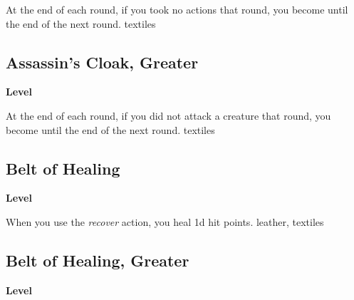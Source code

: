 \vspace{-1.5em}  %
At the end of each round, if you took no actions that round, you become  until the end of the next round.
 
 textiles
\begin{multicols}{2}
\lowercase{\hypertarget{item:Assassin's Cloak, Greater}{}}\label{item:Assassin's Cloak, Greater}
\hypertarget{item:Assassin's Cloak, Greater}{\subsection{Assassin's Cloak, Greater}}
\columnbreak%
\begin{flushright}
\large\textbf{ Level}
\end{flushright}
\end{multicols}
\vspace{-1.5em}  %
At the end of each round, if you did not attack a creature that round, you become  until the end of the next round.
 
 textiles
\begin{multicols}{2}
\lowercase{\hypertarget{item:Belt of Healing}{}}\label{item:Belt of Healing}
\hypertarget{item:Belt of Healing}{\subsection{Belt of Healing}}
\columnbreak%
\begin{flushright}
\large\textbf{ Level}
\end{flushright}
\end{multicols}
\vspace{-1.5em}  %
When you use the \textit{recover} action, you heal \plus1d hit points.
 
 leather, textiles
\begin{multicols}{2}
\lowercase{\hypertarget{item:Belt of Healing, Greater}{}}\label{item:Belt of Healing, Greater}
\hypertarget{item:Belt of Healing, Greater}{\subsection{Belt of Healing, Greater}}
\columnbreak%
\begin{flushright}
\large\textbf{ Level}
\end{flushright}
\end{multicols}
